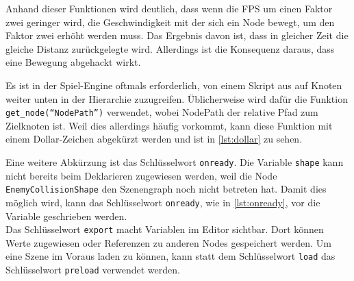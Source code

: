 Anhand dieser Funktionen wird deutlich, dass wenn die \ac{FPS} um einen Faktor zwei geringer wird, die Geschwindigkeit mit der sich ein Node bewegt, um den Faktor zwei erhöht werden muss.
Das Ergebnis davon ist, dass in gleicher Zeit die gleiche Distanz zurückgelegte wird.
Allerdings ist die Konsequenz daraus, dass eine Bewegung abgehackt wirkt.


Es ist in der Spiel-Engine oftmals erforderlich, von einem Skript aus auf Knoten weiter unten in der Hierarchie zuzugreifen.
Üblicherweise wird dafür die Funktion \texttt{get\_node(``NodePath'')} verwendet, wobei NodePath der relative Pfad zum Zielknoten ist.
Weil dies allerdings häufig vorkommt, kann diese Funktion mit einem Dollar-Zeichen abgekürzt werden und ist in \autoref{lst:dollar} zu sehen.


Eine weitere Abkürzung ist das Schlüsselwort \texttt{onready}.
Die Variable \texttt{shape} kann nicht bereits beim Deklarieren zugewiesen werden, weil die Node \texttt{EnemyCollisionShape} den Szenengraph noch nicht betreten hat.
Damit dies möglich wird, kann das Schlüsselwort \texttt{onready}, wie in \autoref{lst:onready}, vor die Variable geschrieben werden.\\

Das Schlüsselwort \texttt{export} macht Variablen im Editor sichtbar.
Dort können Werte zugewiesen oder Referenzen zu anderen Nodes gespeichert werden.
Um eine Szene im Voraus laden zu können, kann statt dem Schlüsselwort \texttt{load} das Schlüsselwort \texttt{preload} verwendet werden.

